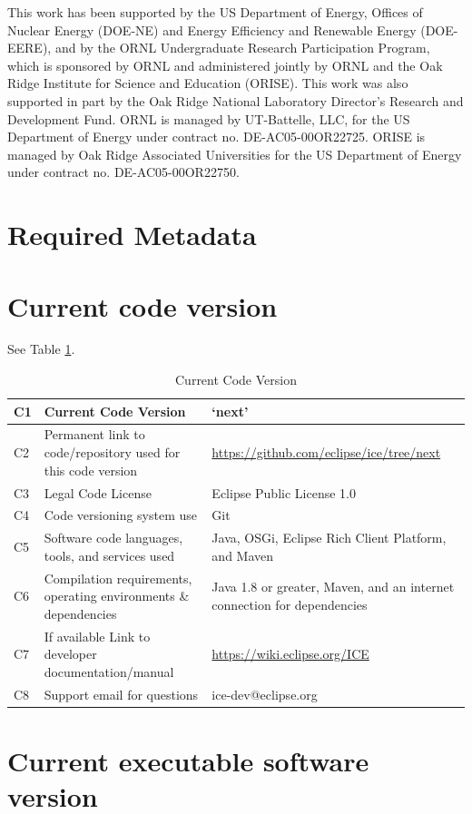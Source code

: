 This work has been supported by the US Department of Energy, Offices of
Nuclear Energy (DOE-NE) and Energy Efficiency and Renewable Energy
(DOE-EERE), and by the ORNL Undergraduate Research Participation
Program, which is sponsored by ORNL and administered jointly by ORNL and
the Oak Ridge Institute for Science and Education (ORISE). This work was
also supported in part by the Oak Ridge National Laboratory Director's
Research and Development Fund. ORNL is managed by UT-Battelle, LLC, for
the US Department of Energy under contract no. DE-AC05-00OR22725. ORISE
is managed by Oak Ridge Associated Universities for the US Department of
Energy under contract no. DE-AC05-00OR22750.

\section*{Required Metadata}\label{required-metadata}

\section*{Current code version}\label{current-code-version}

See Table \ref{codeTable}.

\begin{table}[!htbp]
\begin{tabularx}{\textwidth}{|l|X|X|}
\hline
C1 & Current Code Version & `next'\tabularnewline\hline
C2 & Permanent link to code/repository used for this code version &
\url{https://github.com/eclipse/ice/tree/next}
\tabularnewline\hline
C3 & Legal Code License & Eclipse Public License 1.0 \tabularnewline\hline
C4 & Code versioning system use & Git \tabularnewline\hline
C5 & Software code languages, tools, and services used & Java, OSGi, Eclipse Rich Client Platform,
and Maven \tabularnewline\hline
C6 & Compilation requirements, operating environments \& dependencies & Java 1.8 or greater, Maven, and
an internet connection for dependencies \tabularnewline\hline 
C7 & If available Link to developer documentation/manual &
\url{https://wiki.eclipse.org/ICE} \tabularnewline\hline 
C8 & Support email for questions & ice-dev@eclipse.org \tabularnewline\hline
\end{tabularx}
\caption{Current Code Version}
\label{codeTable}
\end{table}

\section*{Current executable software
version}\label{current-executable-software-version}

